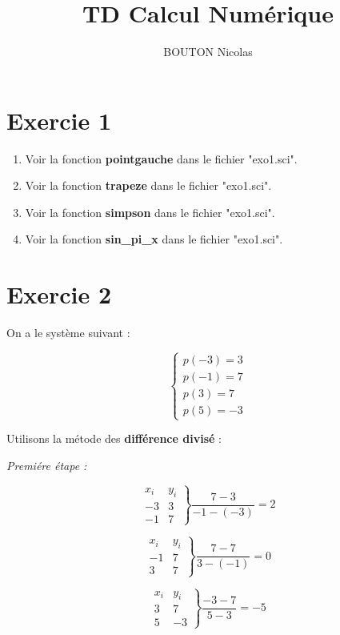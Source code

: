 \documentclass[12pt, letterpaper]{article}
\title{TD Calcul Numérique}
\author{BOUTON Nicolas}
\begin{document}
\maketitle

\section{Exercie 1}

\begin{enumerate}
\item Voir la fonction \textbf{pointgauche} dans le fichier "exo1.sci".
\item Voir la fonction \textbf{trapeze} dans le fichier "exo1.sci".
\item Voir la fonction \textbf{simpson} dans le fichier "exo1.sci".
\item Voir la fonction \textbf{sin\_pi\_x} dans le fichier "exo1.sci".
\end{enumerate}

\section{Exercie 2}

On a le système suivant :

$$
\left\{
\begin{array}{l}
  p(-3) = 3 \\
  p(-1) = 7 \\
  p(3) = 7 \\
  p(5) = -3
\end{array}
\right.
$$

Utilisons la métode des \textbf{différence divisé} :

\textit{Premiére étape :}

$$
\left.
\begin{array}{ll}
  x_i & y_i \\
  -3 & 3 \\
  -1 & 7
\end{array}
\right\}
\frac{7 - 3}{-1 - (-3)} = 2
$$

$$
\left.
\begin{array}{ll}
  x_i & y_i \\
  -1 & 7 \\
  3 & 7
\end{array}
\right\}
\frac{7 - 7}{3 - (-1)} = 0
$$

$$
\left.
\begin{array}{ll}
  x_i & y_i \\
  3 & 7 \\
  5 & -3
\end{array}
\right\}
\frac{-3 - 7}{5 - 3} = -5
$$
\end{document}
